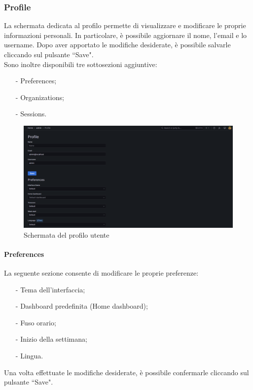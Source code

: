\documentclass[10pt]{article}
\begin{document}
\begin{justify}
    \subsubsection{Profile}
    La schermata dedicata al profilo permette di visualizzare e modificare le proprie informazioni personali. In particolare, è possibile aggiornare il nome, l'email e lo username. Dopo aver apportato le modifiche desiderate, è possibile salvarle cliccando sul pulsante ``Save".\\
    Sono inoltre disponibili tre sottosezioni aggiuntive:
    \begin{itemize}
        \item[-] Preferences;
        \item[-] Organizations;
        \item[-] Sessions.
    \end{itemize}
    \begin{figure}[H]
    \centering
    \includegraphics[width=1\linewidth]{profile.png}
    \caption{Schermata del profilo utente}
    \end{figure}

    \paragraph{Preferences}
    La seguente sezione consente di modificare le proprie preferenze:  
    \begin{itemize}  
        \item[-] Tema dell'interfaccia;  
        \item[-] Dashboard predefinita (Home dashboard);  
        \item[-] Fuso orario;  
        \item[-] Inizio della settimana;  
        \item[-] Lingua.  
    \end{itemize}  
    Una volta effettuate le modifiche desiderate, è possibile confermarle cliccando sul pulsante ``Save". 
    

\end{justify}
\end{document}
